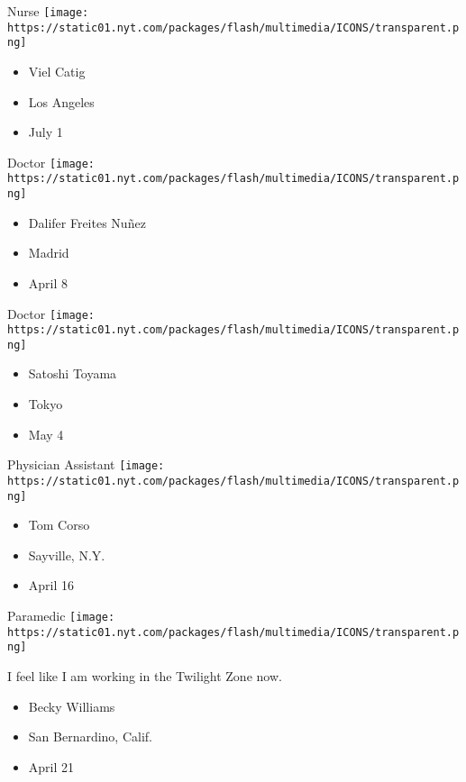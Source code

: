 \protect\hyperlink{item-viel-catig}{}

Nurse
\texttt{[image: https://static01.nyt.com/packages/flash/multimedia/ICONS/transparent.png]}

\begin{itemize}
\tightlist
\item
  Viel Catig
\item
  Los Angeles
\item
  July 1
\end{itemize}

\protect\hyperlink{item-dalifer-freites-nunez}{}

Doctor
\texttt{[image: https://static01.nyt.com/packages/flash/multimedia/ICONS/transparent.png]}

\begin{itemize}
\tightlist
\item
  Dalifer Freites Nuñez
\item
  Madrid
\item
  April 8
\end{itemize}

\protect\hyperlink{item-satoshi-toyama}{}

Doctor
\texttt{[image: https://static01.nyt.com/packages/flash/multimedia/ICONS/transparent.png]}

\begin{itemize}
\tightlist
\item
  Satoshi Toyama
\item
  Tokyo
\item
  May 4
\end{itemize}

\protect\hyperlink{item-tom-corso}{}

Physician Assistant
\texttt{[image: https://static01.nyt.com/packages/flash/multimedia/ICONS/transparent.png]}

\begin{itemize}
\tightlist
\item
  Tom Corso
\item
  Sayville, N.Y.
\item
  April 16
\end{itemize}

\protect\hyperlink{item-becky-williams}{}

Paramedic
\texttt{[image: https://static01.nyt.com/packages/flash/multimedia/ICONS/transparent.png]}

I feel like I am working in the Twilight Zone now.

\begin{itemize}
\tightlist
\item
  Becky Williams
\item
  San Bernardino, Calif.
\item
  April 21
\end{itemize}

